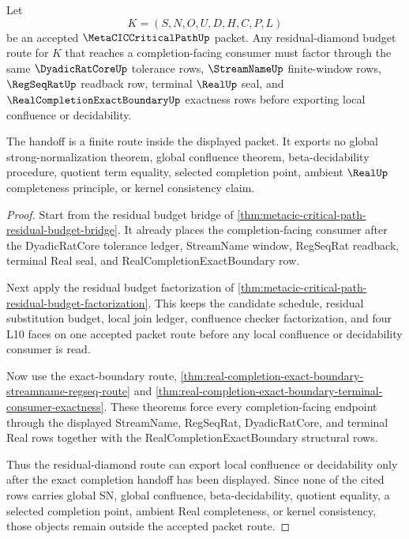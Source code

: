 \begin{theorem}
\label{thm:metacic-critical-path-residual-completion-exactness-handoff}
Let
$$
K=(S,N,O,U,D,H,C,P,L)
$$
be an accepted $\MetaCICCriticalPathUp$ packet. Any residual-diamond budget route for $K$ that reaches a completion-facing consumer must factor through the same $\DyadicRatCoreUp$ tolerance rows, $\StreamNameUp$ finite-window rows, $\RegSeqRatUp$ readback row, terminal $\RealUp$ seal, and $\RealCompletionExactBoundaryUp$ exactness rows before exporting local confluence or decidability.

The handoff is a finite route inside the displayed packet. It exports no global strong-normalization theorem, global confluence theorem, beta-decidability procedure, quotient term equality, selected completion point, ambient $\RealUp$ completeness principle, or kernel consistency claim.
\end{theorem}
\begin{proof}
Start from the residual budget bridge of \autoref{thm:metacic-critical-path-residual-budget-bridge}. It already places the completion-facing consumer after the DyadicRatCore tolerance ledger, StreamName window, RegSeqRat readback, terminal Real seal, and RealCompletionExactBoundary row.

Next apply the residual budget factorization of \autoref{thm:metacic-critical-path-residual-budget-factorization}. This keeps the candidate schedule, residual substitution budget, local join ledger, confluence checker factorization, and four L10 faces on one accepted packet route before any local confluence or decidability consumer is read.

Now use the exact-boundary route, \autoref{thm:real-completion-exact-boundary-streamname-regseq-route} and \autoref{thm:real-completion-exact-boundary-terminal-consumer-exactness}. These theorems force every completion-facing endpoint through the displayed StreamName, RegSeqRat, DyadicRatCore, and terminal Real rows together with the RealCompletionExactBoundary structural rows.

Thus the residual-diamond route can export local confluence or decidability only after the exact completion handoff has been displayed. Since none of the cited rows carries global SN, global confluence, beta-decidability, quotient equality, a selected completion point, ambient Real completeness, or kernel consistency, those objects remain outside the accepted packet route.
\end{proof}


